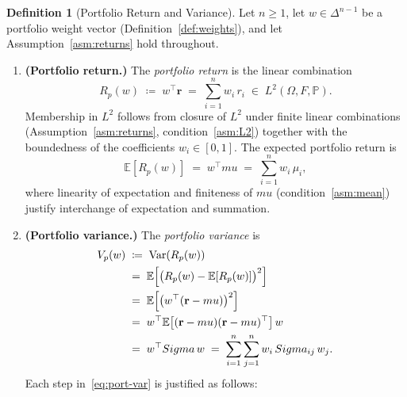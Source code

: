 \documentclass[12pt,openany]{book}
\newcommand{\E}{\mathbb{E}}
\newcommand{\Prob}{\mathbb{P}}
\newcommand{\bfw}{\mathbf{w}}
\newcommand{\bfmu}{\boldsymbol{\mu}}
\newcommand{\bfSigma}{\boldsymbol{\Sigma}}
\newcommand{\calF}{\mathcal{F}}
\DeclareMathOperator{\Var}{Var}
\numberwithin{equation}{chapter}
\theoremstyle{plain}
\theoremstyle{definition}
\newtheorem{definition}[theorem]{Definition}
\theoremstyle{remark}
\def\mathcal#1{#1}%
\def\calF{F}%
\def\bfw{w}%
\def\bfmu{mu}%
\def\bfSigma{Sigma}%
\begin{document}
\begin{definition}[Portfolio Return and Variance]
\label{def:portfolio-rv}
Let $n \geq 1$, let $\bfw \in \Delta^{n-1}$ be a portfolio weight
vector (Definition~\ref{def:weights}), and let
Assumption~\ref{asm:returns} hold throughout.
\begin{enumerate}[label=\textbf{(D\arabic*)}, leftmargin=*, widest=D2]

  \item \textbf{(Portfolio return.)}
        The \emph{portfolio return} is the linear combination
        \begin{equation}
          R_p(\bfw)
          \;\coloneqq\;
          \bfw^\top \mathbf{r}
          \;=\;
          \sum_{i=1}^{n} w_i\, r_i
          \;\in\; L^2(\Omega, \calF, \Prob).
          \label{eq:port-return}
        \end{equation}
        Membership in $L^2$ follows from closure of $L^2$ under
        finite linear combinations
        (Assumption~\ref{asm:returns}, condition~\eqref{asm:L2})
        together with the boundedness of the coefficients
        $w_i \in [0,1]$.
        The expected portfolio return is
        \begin{equation}
          \E\!\left[R_p(\bfw)\right]
          \;=\;
          \bfw^\top \bfmu
          \;=\;
          \sum_{i=1}^{n} w_i\,\mu_i,
          \label{eq:port-mean}
        \end{equation}
        where linearity of expectation and
        finiteness of $\bfmu$ (condition~\eqref{asm:mean})
        justify interchange of expectation and summation.

  \item \textbf{(Portfolio variance.)}
        The \emph{portfolio variance} is
        \begin{align}
          V_p(\bfw)
          &\;\coloneqq\;
          \Var\!\left(R_p(\bfw)\right)
          \notag\\
          &\;=\;
          \E\!\left[
            \bigl(R_p(\bfw) - \E[R_p(\bfw)]\bigr)^2
          \right]
          \notag\\
          &\;=\;
          \E\!\left[
            \bigl(\bfw^\top(\mathbf{r} - \bfmu)\bigr)^2
          \right]
          \notag\\
          &\;=\;
          \bfw^\top
          \E\!\left[
            (\mathbf{r}-\bfmu)(\mathbf{r}-\bfmu)^\top
          \right]
          \bfw
          \notag\\
          &\;=\;
          \bfw^\top \bfSigma\, \bfw
          \;=\;
          \sum_{i=1}^{n}\sum_{j=1}^{n}
            w_i\,\bfSigma_{ij}\,w_j.
          \label{eq:port-var}
        \end{align}
        Each step in~\eqref{eq:port-var} is justified as follows:
        \begin{enumerate}[label=\textbf{(J\arabic*)},
                          leftmargin=*, widest=J3]


\end{enumerate}
\end{enumerate}
\end{definition}
\end{document}
